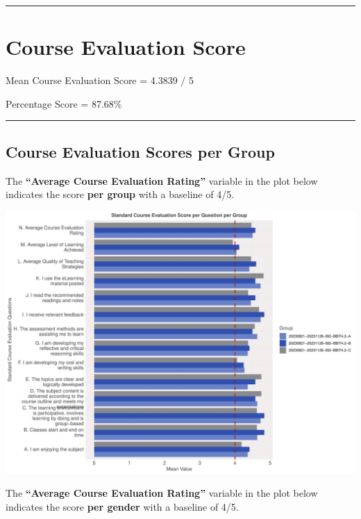 \documentclass[
]{article}
\begin{document}
\newpage

\begin{center}\rule{0.5\linewidth}{0.5pt}\end{center}

\section{Course Evaluation Score}\label{course-evaluation-score}

Mean Course Evaluation Score = 4.3839 / 5

Percentage Score = 87.68\%

\begin{center}\rule{0.5\linewidth}{0.5pt}\end{center}

\subsection{Course Evaluation Scores per
Group}\label{course-evaluation-scores-per-group}

The \textbf{``Average Course Evaluation Rating''} variable in the plot
below indicates the score \textbf{per group} with a baseline of 4/5.

\includegraphics{AnalysisOfCourseEvaluation-Notebook_files/figure-latex/VisualizationsForCourseEvaluationResultsperClassGroup-1.pdf}

\newpage

The \textbf{``Average Course Evaluation Rating''} variable in the plot
below indicates the score \textbf{per gender} with a baseline of 4/5.
\end{document}
